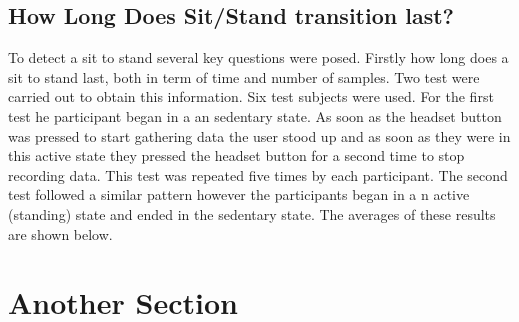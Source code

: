 \subsection{How Long Does Sit/Stand transition last?} %
\label{sub:subsection_stslength}
To detect a sit to stand several key questions were posed. Firstly how long does a sit to stand last, both in term of time and number of samples. Two test were carried out to obtain this information. Six test subjects were used. For the first test he participant began in a an sedentary state. As soon as the headset button was pressed to start gathering data the user stood up and as soon as they were in this active state they pressed the headset button for a second time to stop recording data. This test was repeated five times by each participant. The second test followed a similar pattern however the participants began in a n active (standing) state and ended in the sedentary state. The averages of these results are shown below. 


\section{Another Section} %
\label{sec:another_section}


